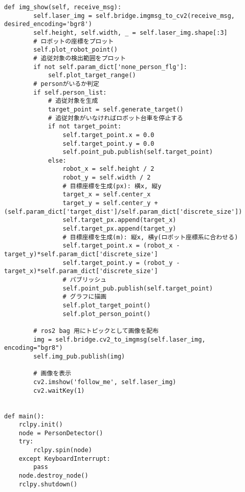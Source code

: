 \begin{lstlisting}[caption=person\_detector.py, label=person]
    def img_show(self, receive_msg):
        self.laser_img = self.bridge.imgmsg_to_cv2(receive_msg, desired_encoding='bgr8')
        self.height, self.width, _ = self.laser_img.shape[:3]
        # ロボットの座標をプロット
        self.plot_robot_point()
        # 追従対象の検出範囲をプロット
        if not self.param_dict['none_person_flg']:
            self.plot_target_range()
        # personがいるか判定
        if self.person_list:
            # 追従対象を生成
            target_point = self.generate_target()
            # 追従対象がいなければロボット台車を停止する
            if not target_point:
                self.target_point.x = 0.0
                self.target_point.y = 0.0
                self.point_pub.publish(self.target_point)
            else:
                robot_x = self.height / 2
                robot_y = self.width / 2
                # 目標座標を生成(px): 横x, 縦y
                target_x = self.center_x
                target_y = self.center_y + (self.param_dict['target_dist']/self.param_dict['discrete_size'])
                self.target_px.append(target_x)
                self.target_px.append(target_y)
                # 目標座標を生成(m): 縦x, 横y(ロボット座標系に合わせる)
                self.target_point.x = (robot_x - target_y)*self.param_dict['discrete_size']
                self.target_point.y = (robot_y - target_x)*self.param_dict['discrete_size']
                # パブリッシュ
                self.point_pub.publish(self.target_point)
                # グラフに描画
                self.plot_target_point()
                self.plot_person_point()

        # ros2 bag 用にトピックとして画像を配布
        img = self.bridge.cv2_to_imgmsg(self.laser_img, encoding="bgr8")
        self.img_pub.publish(img)

        # 画像を表示
        cv2.imshow('follow_me', self.laser_img)
        cv2.waitKey(1)


def main():
    rclpy.init()
    node = PersonDetector()
    try:
        rclpy.spin(node)
    except KeyboardInterrupt:
        pass
    node.destroy_node()
    rclpy.shutdown()
\end{lstlisting}

